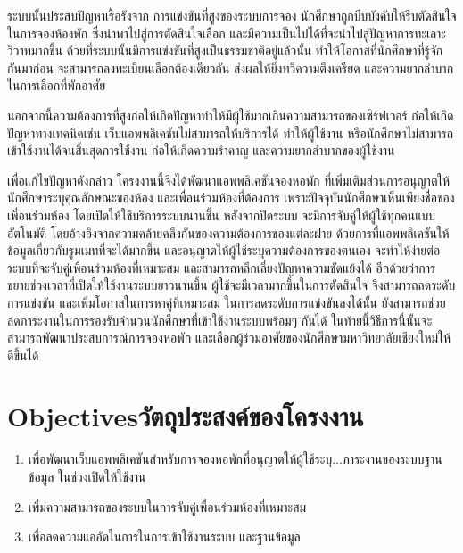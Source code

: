 ระบบนั้นประสบปัญหาเรื้อรังจาก การแข่งขันที่สูงของระบบการจอง นักศึกษาถูกบีบบังคับให้รีบตัดสินใจในการจองห้องพัก
ซึ่งนำพาไปสู่การตัดสินใจเลือก และมีความเป็นไปได้ที่จะนำไปสู่ปัญหาการทะเลาะวิวาทมากขึ้น ด้วยที่ระบบนั้นมีการแข่งขันที่สูงเป็นธรรมชาติอยู่แล้วนั้น
ทำให้โอกาสที่นักศึกษาที่รู้จักกันมาก่อน จะสามารถลงทะเบียนเลือกต้องเดียวกัน ส่งผลให้ยิ่งทวีความตึงเครียด
และความยากลำบากในการเลือกที่พักอาศัย

นอกจากนี้ความต้องการที่สูงก่อให้เกิดปัญหาทำให้มีผู้ใช้มากเกินความสามารถของเซิร์ฟเวอร์ ก่อให้เกิดปัญหาทางเทคนิคเช่น 
เว็บแอพพลิเคชันไม่สามารถให้บริการได้ ทำให้ผู้ใช้งาน หรือนักศึกษาไม่สามารถเข้าใช้งานได้จนสิ้นสุดการใช้งาน 
ก่อให้เกิดความรำคาญ และความยากลำบากของผู้ใช้งาน

เพื่อแก้ไขปัญหาดังกล่าว โครงงานนี้จึงได้พัฒนาแอพพลิเคชันจองหอพัก 
ที่เพิ่มเติมส่วนการอนุญาตให้นักศึกษาระบุคุณลักษณะของห้อง 
และเพื่อนร่วมห้องที่ต้องการ เพราะปัจจุบันนักศึกษาเห็นเพียงชื่อของเพื่อนร่วมห้อง
โดยเปิดให้ใช้บริการระบบนานขึ้น หลังจากปิดระบบ จะมีการจับคู่ให้ผู้ใช้ทุกคนแบบอัตโนมัติ 
โดยอ้างอิงจากความคล้ายคลึงกันของความต้องการของแต่ละฝ่าย
ด้วยการที่แอพพลิเคชันให้ข้อมูลเกี่ยวกับรูมเมทที่จะได้มากขึ้น และอนุญาตให้ผู้ใช้ระบุความต้องการของตนเอง 
จะทำให้ง่ายต่อระบบที่จะจับคู่เพื่อนร่วมห้องที่เหมาะสม และสามารถหลีกเลี่ยงปัญหาความขัดแย้งได้ 
อีกด้วยว่าการขยายช่วงเวลาที่เปิดให้ใช้งานระบบยาวนานขึ้น ผู้ใช้จะมีเวลามากขึ้นในการตัดสินใจ 
จึงสามารถลดระดับการแข่งขัน และเพิ่มโอกาสในการหาคู่ที่เหมาะสม ในการลดระดับการแข่งขันลงได้นั้น 
ยังสามารถช่วยลดภาระงานในการรองรับจำนวนนักศึกษาที่เข้าใช้งานระบบพร้อมๆ กันได้ 
ในท้ายนี้วิธีการนี้นั้นจะสามารถพัฒนาประสบการณ์การจองหอพัก 
และเลือกผู้ร่วมอาศัยของนักศึกษามหาวิทยาลัยเชียงใหม่ให้ดีขึ้นได้

\section{\ifenglish Objectives\else วัตถุประสงค์ของโครงงาน\fi}
\begin{enumerate}
    \item เพื่อพัฒนาเว็บแอพพลิเคชันสำหรับการจองหอพักที่อนุญาตให้ผู้ใช้ระบุ...ภาระงานของระบบฐานข้อมูล ในช่วงเปิดให้ใช้งาน
    \item เพิ่มความสามารถของระบบในการจับคู่เพื่อนร่วมห้องที่เหมาะสม
    \item เพื่อลดความแออัดในการในการเข้าใช้งานระบบ และฐานข้อมูล
\end{enumerate}


